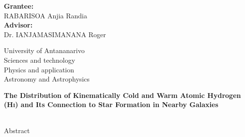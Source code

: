 \documentclass[12pt]{article}
\newcommand{\HI}{\textrm{H\textsc{i}}}
\begin{document}
\newpage
\begin{minipage}[t]{0.48\textwidth}
	\textbf{Grantee:} \\
	RABARISOA Anjia Randia \\
	\textbf{Advisor:}\\
	Dr. IANJAMASIMANANA Roger
	
\end{minipage}
\hfill
\begin{minipage}[t]{0.48\textwidth}
	\raggedleft
	University of Antananarivo\\
	Sciences and technology\\
	Physics and application\\
	Astronomy and Astrophysics\\
\end{minipage}
\vspace{1cm}
\begin{center}
		\large \parbox{\linewidth}{\centering\fontsize{15}{18}\selectfont\linespread{1}\selectfont\bfseries The Distribution of Kinematically Cold and Warm Atomic Hydrogen (\HI) and Its Connection to Star Formation in Nearby Galaxies}\\[1em]
	Abstract
\end{center}

\vspace{1em}
\end{document}

